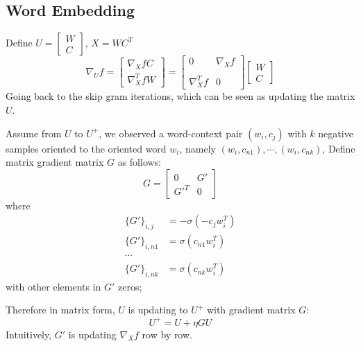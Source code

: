 \documentclass[letterpaper]{article} %
\begin{document}
\subsection{Word Embedding}
Define $U=\begin{bmatrix}W\\C\end{bmatrix}$, $X=WC^T$
\begin{equation}
\nabla_U f=\begin{bmatrix}\nabla_X fC\\\nabla^T_X fW\end{bmatrix}=\begin{bmatrix}0&\nabla_X f\\ \\\nabla^T_X f&0\end{bmatrix}\begin{bmatrix}W\\C\end{bmatrix}
\end{equation}
Going back to the skip gram iterations, which can be seen as updating the matrix $U$.

Assume from $U$ to $U^+$, we observed a word-context pair $(w_i,c_j)$ with $k$ negative samples oriented to the oriented word $w_i$, namely $(w_i,c_{n1}),\cdots,(w_i,c_{nk})$, Define matrix gradient matrix $G$ as follows:
\begin{equation}
G=\begin{bmatrix}0&G'\\G'^T&0\end{bmatrix}
\end{equation}
where
\[
\begin{split}
\{G'\}_{i,j}&=-\sigma(-c_jw_i^T)\\
\{G'\}_{i,n1}&=\sigma(c_{n1}w_i^T)\\
\cdots\\
\{G'\}_{i,nk}&=\sigma(c_{nk}w_i^T)
\end{split}
\]
with other elements in $G'$ zeros;


Therefore in matrix form, $U$ is updating to $U^+$ with gradient matrix $G$:
\begin{equation}
U^+=U+\eta GU
\end{equation}
Intuitively, $G'$ is updating $\nabla_X f$ row by row.
\end{document}
